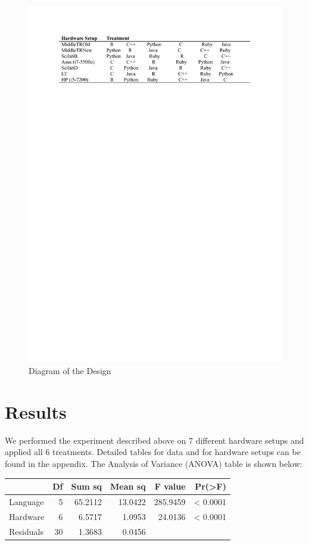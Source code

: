 \documentclass[12pt,halfline,a4paper,]{ouparticle}
\begin{document}
\begin{figure}[H]
\includegraphics[width=1\linewidth]{diagram} \caption{Diagram of the Design}\label{fig:unnamed-chunk-1}
\end{figure}

\newpage

\section{Results}\label{results}

We performed the experiment described above on 7 different hardware
setups and applied all 6 treatments. Detailed tables for data and for
hardware setups can be found in the appendix. The Analysis of Variance
(ANOVA) table is shown below:

\begin{longtable}[]{@{}lrrrrr@{}}
\toprule\noalign{}
& Df & Sum sq & Mean sq & F value & Pr(\textgreater F) \\
\midrule\noalign{}
\endhead
\bottomrule\noalign{}
\endlastfoot
Language & 5 & 65.2112 & 13.0422 & 285.9459 & \textless{} 0.0001 \\
Hardware & 6 & 6.5717 & 1.0953 & 24.0136 & \textless{} 0.0001 \\
Residuals & 30 & 1.3683 & 0.0456 & & \\
\end{longtable}
\end{document}
